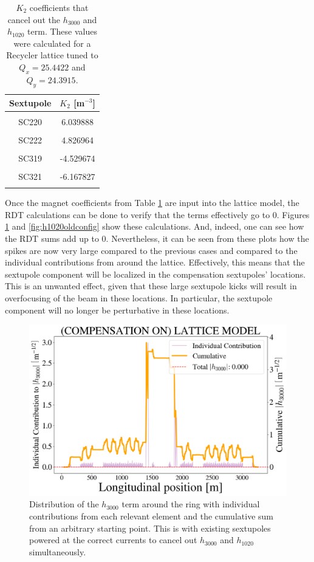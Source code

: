 \begin{table}[H]
    \centering
    \caption{$K_2$ coefficients that cancel out the $h_{3000}$ and $h_{1020}$ term. These values were calculated for a Recycler lattice tuned to $Q_x=25.4422$ and $Q_y=24.3915$.}
    \label{tab:k2sboth}
    \begin{tabular}{cc}
    \toprule
    \textbf{Sextupole} & $K_2$ [m$^{-3}$] \\ \midrule
     &  \\
    SC220 & 6.039888 \\
     &  \\
    SC222 & 4.826964 \\
     &  \\
    SC319 & -4.529674 \\
     &  \\
    SC321 & -6.167827 \\
     &  \\ \hline
    \end{tabular}
    \end{table}

Once the magnet coefficients from Table \ref{tab:k2sboth} are input into the lattice model, the RDT calculations can be done to verify that the terms effectively go to 0. Figures \ref{fig:h3000oldconfig} and \ref{fig:h1020oldconfig} show these calculations. And, indeed, one can see how the RDT sums add up to 0. Nevertheless, it can be seen from these plots how the spikes are now very large compared to the previous cases and compared to the individual contributions from around the lattice. Effectively, this means that the sextupole component will be localized in the compensation sextupoles' locations. This is an unwanted effect, given that these large sextupole kicks will result in overfocusing of the beam in these locations. In particular, the sextupole component will no longer be perturbative in these locations. 

\begin{figure}[H]
    \centering
    \includegraphics[width=\columnwidth]{chapter4/old_config_h3000.png}
    \caption{Distribution of the $h_{3000}$ term around the ring with individual contributions from each relevant element and the cumulative sum from an arbitrary starting point. This is with existing sextupoles powered at the correct currents to cancel out $h_{3000}$ and $h_{1020}$ simultaneously.}
    \label{fig:h3000oldconfig}
\end{figure}

